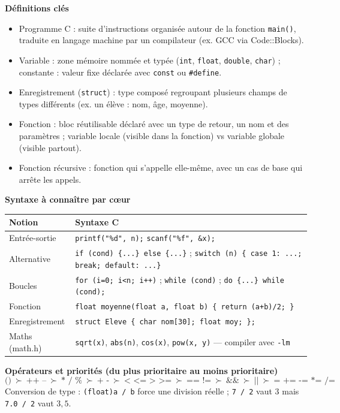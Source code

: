 \documentclass[11pt]{article}
\newcommand{\cle}[1]{{\popxbold\color{popdark}#1}}
\begin{document}
\begin{bilan}
\textbf{Définitions clés}
\begin{itemize}
  \item \cle{Programme C} : suite d'instructions organisée autour de la fonction \texttt{main()}, traduite en langage machine par un \cle{compilateur} (ex. GCC via Code::Blocks).
  \item \cle{Variable} : zone mémoire nommée et typée (\texttt{int}, \texttt{float}, \texttt{double}, \texttt{char}) ; \cle{constante} : valeur fixe déclarée avec \texttt{const} ou \texttt{\#define}.
  \item \cle{Enregistrement} (\texttt{struct}) : type composé regroupant plusieurs champs de types différents (ex. un élève : nom, âge, moyenne).
  \item \cle{Fonction} : bloc réutilisable déclaré avec un type de retour, un nom et des paramètres ; \cle{variable locale} (visible dans la fonction) vs \cle{variable globale} (visible partout).
  \item \cle{Fonction récursive} : fonction qui s'appelle elle-même, avec un \cle{cas de base} qui arrête les appels.
\end{itemize}

\textbf{Syntaxe à connaître par cœur}
\begin{center}
\begin{tabularx}{\linewidth}{|l|X|}
\hline
\rowcolor{popblueL} \textbf{Notion} & \textbf{Syntaxe C} \\
\hline
Entrée-sortie & \texttt{printf("\%d", n);} \quad \texttt{scanf("\%f", \&x);} \\
\hline
Alternative & \texttt{if (cond) \{...\} else \{...\}} ; \texttt{switch (n) \{ case 1: ...; break; default: ...\}} \\
\hline
Boucles & \texttt{for (i=0; i<n; i++)} ; \texttt{while (cond)} ; \texttt{do \{...\} while (cond);} \\
\hline
Fonction & \texttt{float moyenne(float a, float b) \{ return (a+b)/2; \}} \\
\hline
Enregistrement & \texttt{struct Eleve \{ char nom[30]; float moy; \};} \\
\hline
Maths (math.h) & \texttt{sqrt(x)}, \texttt{abs(n)}, \texttt{cos(x)}, \texttt{pow(x, y)} — compiler avec \texttt{-lm} \\
\hline
\end{tabularx}
\end{center}

\textbf{Opérateurs et priorités (du plus prioritaire au moins prioritaire)}
\[ \texttt{()}\ \succ\ \texttt{++ --}\ \succ\ \texttt{* / \%}\ \succ\ \texttt{+ -}\ \succ\ \texttt{< <= > >=}\ \succ\ \texttt{== !=}\ \succ\ \texttt{\&\&}\ \succ\ \texttt{||}\ \succ\ \texttt{= += -= *= /=} \]
Conversion de type : \texttt{(float)a / b} force une division réelle ; \texttt{7 / 2} vaut $3$ mais \texttt{7.0 / 2} vaut $3{,}5$.


\end{bilan}
\end{document}
